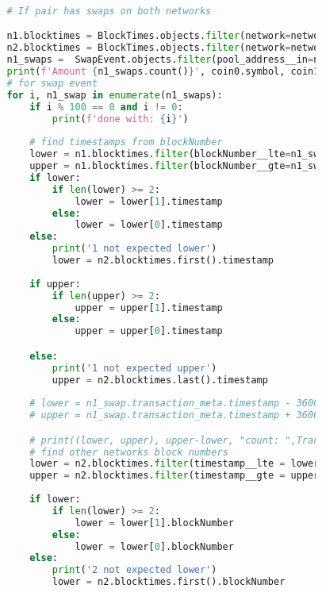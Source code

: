\begin{lstlisting}[language=python]
                
                # If pair has swaps on both networks

                n1.blocktimes = BlockTimes.objects.filter(network=network1)
                n2.blocktimes = BlockTimes.objects.filter(network=network2)
                n1_swaps =  SwapEvent.objects.filter(pool_address__in=n1.pools).exclude(recipient__in=router_addresses, sender__in=router_addresses)
                print(f'Amount {n1_swaps.count()}', coin0.symbol, coin1.symbol)
                # for swap event
                for i, n1_swap in enumerate(n1_swaps):
                    if i % 100 == 0 and i != 0:
                        print(f'done with: {i}')
                    
                    # find timestamps from blockNumber
                    lower = n1.blocktimes.filter(blockNumber__lte=n1_swap.transaction_meta.blockNumber-block_range[network1])[::-1]
                    upper = n1.blocktimes.filter(blockNumber__gte=n1_swap.transaction_meta.blockNumber+block_range[network1])
                    if lower:
                        if len(lower) >= 2:
                            lower = lower[1].timestamp
                        else:
                            lower = lower[0].timestamp
                    else:
                        print('1 not expected lower')
                        lower = n2.blocktimes.first().timestamp
                    
                    if upper:
                        if len(upper) >= 2:
                            upper = upper[1].timestamp
                        else:
                            upper = upper[0].timestamp

                    else:
                        print('1 not expected upper')
                        upper = n2.blocktimes.last().timestamp
                    
                    # lower = n1_swap.transaction_meta.timestamp - 3600
                    # upper = n1_swap.transaction_meta.timestamp + 3600

                    # print((lower, upper), upper-lower, "count: ",TransactionMeta.objects.filter(blockNumber__gte=lower, blockNumber__lte=upper).count())
                    # find other networks block numbers
                    lower = n2.blocktimes.filter(timestamp__lte = lower)[::-1]
                    upper = n2.blocktimes.filter(timestamp__gte = upper)
                    
                    if lower:
                        if len(lower) >= 2:
                            lower = lower[1].blockNumber
                        else:
                            lower = lower[0].blockNumber
                    else:
                        print('2 not expected lower')
                        lower = n2.blocktimes.first().blockNumber
                    

\end{lstlisting}
